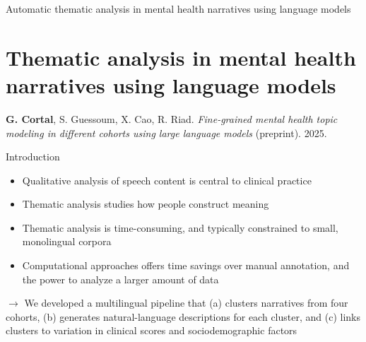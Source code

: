 \documentclass[10pt]{beamer}
\begin{document}
\begin{frame}{}
\Large
\begin{center}
    Automatic thematic analysis in mental health narratives using language models%
    \section{Thematic analysis in mental health narratives using language models}
\end{center}

\vspace{1.5cm}

\footnotesize

\textbf{G. Cortal}, S. Guessoum, X. Cao, R. Riad. \textit{Fine-grained mental health topic modeling in different cohorts using large language models} (preprint). 2025. 

\end{frame}

\begin{frame}{Introduction}

  \begin{itemize}[<+->]
    \item Qualitative analysis of speech content is central to clinical practice
    \item Thematic analysis studies how people construct meaning%
    \item Thematic analysis is time-consuming, and typically constrained to small, monolingual corpora
    \item Computational approaches offers time savings over manual annotation, and the power to analyze a larger amount of data
  \end{itemize}

  \pause
  \vspace{0.5cm}

  $\rightarrow$ We developed a multilingual pipeline that (a) clusters narratives from four cohorts, (b) generates natural-language descriptions for each cluster, and (c) links clusters to variation in clinical scores and sociodemographic factors %

\end{frame}
\end{document}
